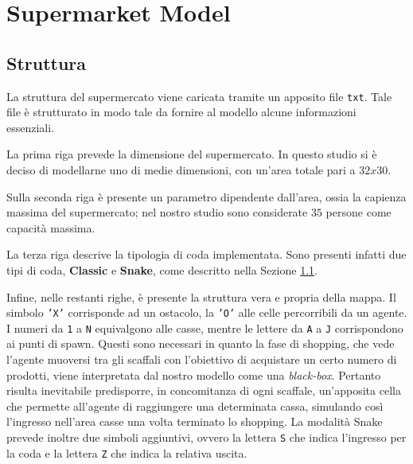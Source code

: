 \section{Supermarket Model}

\subsection{Struttura}
La struttura del supermercato viene caricata tramite un apposito file \lstinline{txt}. 
Tale file è strutturato in modo tale da fornire al modello alcune informazioni essenziali.

La prima riga prevede la dimensione del supermercato.
In questo studio si è deciso di modellarne uno di medie dimensioni, con un'area totale pari a $32x30$.

Sulla seconda riga è presente un parametro dipendente dall'area, ossia la capienza massima del supermercato; nel nostro studio sono considerate $35$ persone come capacità massima. 

La terza riga descrive la tipologia di coda implementata. 
Sono presenti infatti due tipi di coda, \textbf{Classic} e \textbf{
Snake}, come descritto nella Sezione \ref{}.

Infine, nelle restanti righe, è presente la struttura vera e propria della mappa. 
Il simbolo \texttt{'X'} corrisponde ad un ostacolo, la \texttt{'O'} alle celle percorribili da un agente. 
I numeri da \texttt{1} a \texttt{N} equivalgono alle casse, mentre le lettere da \texttt{A} a \texttt{J} corrispondono ai punti di spawn. 
Questi sono necessari in quanto la fase di shopping, che vede l'agente muoversi tra gli scaffali con l'obiettivo di acquistare un certo numero di prodotti, viene interpretata dal nostro modello come una \textit{black-box}. 
Pertanto risulta inevitabile predisporre, in concomitanza di ogni scaffale, un'apposita cella che permette all'agente di raggiungere una determinata cassa, simulando così l'ingresso nell'area casse una volta terminato lo shopping. 
La modalità Snake prevede inoltre due simboli aggiuntivi, ovvero la lettera \texttt{S} che indica l'ingresso per la coda e la lettera \texttt{Z} che indica la relativa uscita. 

